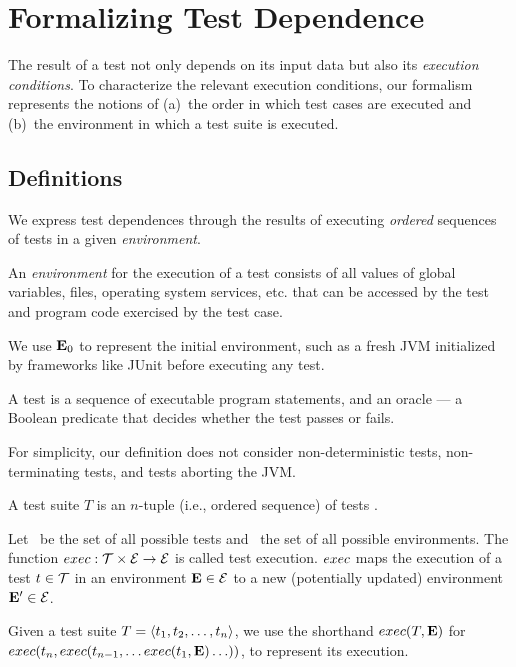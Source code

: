 
\section{Formalizing Test Dependence}
\label{sec:formalism}


The result of a test not only depends on
its input data but also its \emph{execution conditions}.
To characterize the relevant execution conditions, 
our formalism represents the notions of
(a)~the order in which test cases are executed and (b)~the environment in which a test suite is executed.  


\subsection{Definitions}
\label{sec:definitions}

We express test dependences through the results of executing
\emph{ordered} sequences of tests in a given \emph{environment}.


\begin{definition}[Environment]
An \emph{environment} \env for the execution of a test
consists of all values of global variables, files,
operating
system services, etc. that
can be accessed by the test and program code exercised by the test
case.
\end{definition}

We use $\mathbf{E}_0$ to represent the initial environment, such
as a fresh JVM initialized by frameworks like JUnit
before executing any test.


\begin{definition}[Test]

A test is a sequence of executable program statements, and an oracle
--- a Boolean predicate that
decides whether the test passes or fails.
\end{definition}

For simplicity, our definition does not consider non-deterministic
tests, non-terminating tests, and tests aborting the JVM.


\begin{definition}
A test suite\/ $T$ is an $n$-tuple (i.e., ordered sequence) of tests
.

\end{definition}


\begin{definition}
Let\/ \alltests\ be the set of all possible
tests and\/ \environs\ the set of all possible
environments.
The function\/ $exec: \mathcal{T} \times \mathcal{E} \rightarrow
\mathcal{E}$ is called test
execution. $exec$ maps the execution of a test\/ $ t \in
\mathcal{T}$ 
in an environment\/ $\mathbf{E} \in \mathcal{E}$ to a new (potentially updated)
environment\/ $\mathbf{E}' \in \mathcal{E}$.

Given a test suite\/ $T =  \langle t_1, t_2, \dots, t_n \rangle $,
we use the shorthand\/
$exec(T,\mathbf{E})$ for $exec(t_n,exec(t_{n-1},{\dots exec(t_1,\mathbf{E}) \dots }))$, to represent its execution.
\end{definition}

